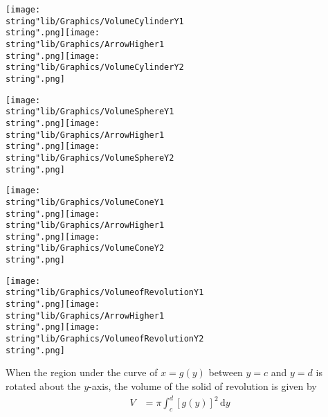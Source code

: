\documentclass[11pt,a4paper]{book}
\begin{document}
\texttt{[image: \\string"lib/Graphics/VolumeCylinderY1\\string".png]}\hspace{1cm}\texttt{[image: \\string"lib/Graphics/ArrowHigher1\\string".png]}\hspace{1cm}\texttt{[image: \\string"lib/Graphics/VolumeCylinderY2\\string".png]}

\texttt{[image: \\string"lib/Graphics/VolumeSphereY1\\string".png]}\hspace{1cm}\texttt{[image: \\string"lib/Graphics/ArrowHigher1\\string".png]}\hspace{1cm}\texttt{[image: \\string"lib/Graphics/VolumeSphereY2\\string".png]}

\texttt{[image: \\string"lib/Graphics/VolumeConeY1\\string".png]}\hspace{1cm}\texttt{[image: \\string"lib/Graphics/ArrowHigher1\\string".png]}\hspace{1cm}\texttt{[image: \\string"lib/Graphics/VolumeConeY2\\string".png]}

\texttt{[image: \\string"lib/Graphics/VolumeofRevolutionY1\\string".png]}\hspace{1cm}\texttt{[image: \\string"lib/Graphics/ArrowHigher1\\string".png]}\hspace{1cm}\texttt{[image: \\string"lib/Graphics/VolumeofRevolutionY2\\string".png]}

\begin{tcolorbox}[colback=blue!5, colframe=black, boxrule=.4pt, sharpish corners]
When the region under the curve of $x=g(y)$ between $y=c$ and $y=d$ is rotated about the $y$-axis, the volume of the solid of revolution is given by
\begin{align*} V & =\pi\int_{c}^{d}[g(y)]^{2}\,\mathrm{d}y \end{align*}
\end{tcolorbox}

\newpage{}
\end{document}
